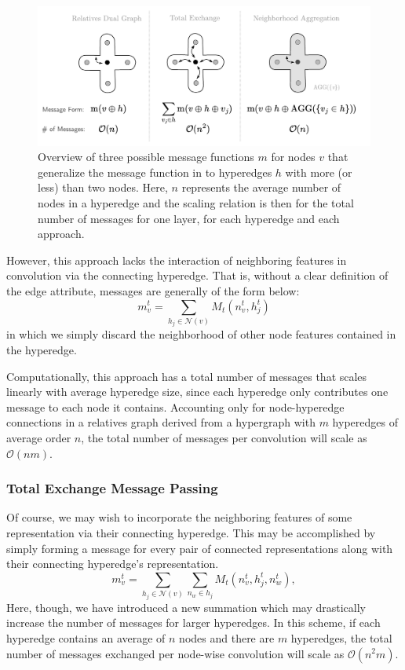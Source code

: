 \documentclass[twoside,twocolumn,9pt]{article}
\begin{document}
\begin{figure}
	\centering
	\includegraphics[scale=.81]{HMPNN.pdf}
	\caption{Overview of three possible message functions $m$ for nodes $v$ that generalize the message function in \cite{mpnn} to hyperedges $h$ with more (or less) than two nodes. Here, $n$ represents the average number of nodes in a hyperedge and the scaling relation is then for the total number of messages for one layer, for each hyperedge and each approach.}
	\label{fig:hmpnn}
\end{figure}

However, this approach lacks the interaction of neighboring features in convolution via the connecting hyperedge. That is, without a clear definition of the edge attribute, messages are generally of the form below:
$$
m_v^{t} = \sum_{h_j\in \mathcal{N}(v)}M_t(n_v^{t},h_j^{t})
$$
in which we simply discard the neighborhood of other node features contained in the hyperedge.

Computationally, this approach has a total number of messages that scales linearly with average hyperedge size, since each hyperedge only contributes one message to each node it contains.
Accounting only for node-hyperedge connections in a relatives graph derived from a hypergraph with $m$ hyperedges of average order $n$, the total number of messages per convolution will scale as $\mathcal{O}(nm)$.

\subsubsection{Total Exchange Message Passing}
Of course, we may wish to incorporate the neighboring features of some representation via their connecting hyperedge. This may be accomplished by simply forming a message for every pair of connected representations along with their connecting hyperedge's representation.
$$
m_v^{t} = \sum_{h_j\in \mathcal{N}(v)} \sum_{n_w \in h_j } M_t(n_v^{t},h_j^{t}, n_w^t),
$$
Here, though, we have introduced a new summation which may drastically increase the number of messages for larger hyperedges. In this scheme, if each hyperedge contains an average of $n$ nodes and there are $m$ hyperedges, the total number of messages exchanged per node-wise convolution will scale as $\mathcal{O}(n^2m)$.
\end{document}

